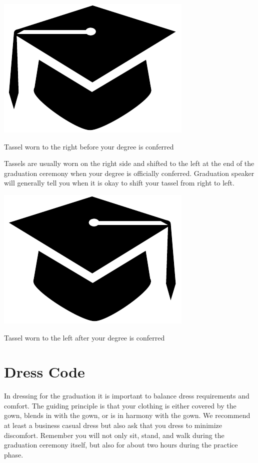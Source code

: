 \documentclass{tufte-handout}
\begin{document}
\begin{marginfigure}[\baselineskip]%
\hspace*{0.02in}
  \includegraphics[width=.45\linewidth]{capbwR}
  \caption{\linespread{1.3}\selectfont{}Tassel worn to the right before your degree is conferred}
  \label{fig:cap-right}
\end{marginfigure}

Tassels are usually worn on the right side and shifted to the left at the end of the graduation ceremony when your degree is officially conferred. Graduation speaker will generally tell you when it is okay to shift your tassel from right to left.

\begin{marginfigure}[\baselineskip]%
\hspace*{0.02in}
  \includegraphics[width=.45\linewidth]{capbwL}
  \caption{\linespread{1.3}\selectfont{}Tassel worn to the left after your degree is conferred}
  \label{fig:cap-left}
\end{marginfigure}

\section{Dress Code}
In dressing for the graduation it is important to balance dress requirements and comfort. The guiding principle is that your clothing is either covered by the gown, blends in with the gown, or is in harmony with the gown. We recommend at least a business casual dress but also ask that you dress to minimize discomfort. Remember you will not only sit, stand, and walk during the graduation ceremony itself, but also for about two hours during the practice phase. 
\end{document}
